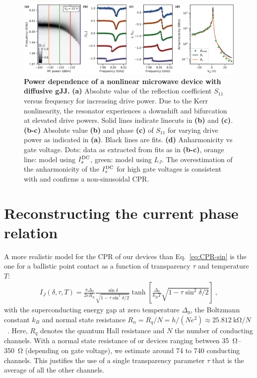 \begin{figure}
	\centering
	\includegraphics[width=\linewidth]{chapter-gJJ-CPR/figs/Figure4}
	\caption{
		\textbf{Power dependence of a nonlinear microwave device with diffusive gJJ.}
		\textbf{(a)} Absolute value of the reflection coefficient $S_{11}$ versus frequency for increasing drive power.
		Due to the Kerr nonlinearity, the resonator experiences a downshift and bifurcation at elevated drive powers.
		Solid lines indicate linecuts in \textbf{(b)} and \textbf{(c)}.
		\textbf{(b-c)} Absolute value \textbf{(b)} and phase \textbf{(c)} of $S_{11}$ for varying drive power as indicated in \textbf{(a)}.
		Black lines are fits.
		\textbf{(d)} Anharmonicity vs gate voltage.
		Dots: data as extracted from fits as in \textbf{(b-c)}, orange line: model using $I_s^{\rm DC}$, green: model using $L_J$.
		The overestimation of the anharmonicity of the $I_s^{\rm DC}$ for high gate voltages is consistent with and confirms a non-sinusoidal CPR.
	}
	\label{fig:figure4}
\end{figure}

\section{Reconstructing the current phase relation}

A more realistic model for the CPR of our devices than Eq.~\ref{eq:CPR-sin} is the one for a ballistic point contact as a function of transparency $\tau$ and temperature $T$:
%
\begin{align}
I_J(\delta,\tau,T) = \frac{\pi\Delta_0}{2 e R_n} \frac{\sin\delta}{\sqrt{1 - \tau \sin^2\delta / 2}} \tanh\left[\frac{\Delta_0}{k_B T} \sqrt{1 - \tau \sin^2\delta / 2}\right]\ ,
\label{eq:CPR-ball}
\end{align}
%
with the superconducting energy gap at zero temperature $\Delta_0$, the Boltzmann constant $k_B$ and normal state resistance $R_n= R_q/N = h/(Ne^2)\approx \SI{25.812}{\kilo\ohm} / N$~\cite{golubovCurrentphaseRelationJosephson2004a}.
%
Here, $R_q$ denotes the quantum Hall resistance and $N$ the number of conducting channels.
%
With a normal state resistance of or devices ranging between \SIrange{35}{350}{\ohm} (depending on gate voltage), we estimate around 74 to 740 conducting channels.
%
This justifies the use of a single transparency parameter $\tau$ that is the average of all the other channels.

